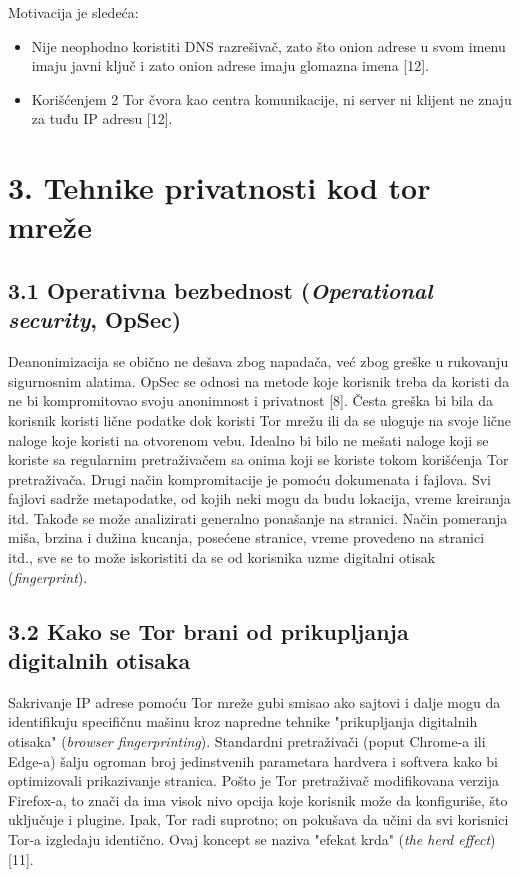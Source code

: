 \documentclass[
]{article}
\begin{document}
Motivacija je sledeća:

\begin{itemize}
\item
  Nije neophodno koristiti DNS razrešivač, zato što onion adrese u svom
  imenu imaju javni ključ i zato onion adrese imaju glomazna imena
  [12].
\item
  Korišćenjem 2 Tor čvora kao centra komunikacije, ni server ni klijent
  ne znaju za tuđu IP adresu [12].
\end{itemize}

\section{3. Tehnike privatnosti kod tor mreže}
\label{sec:t3}

\subsection{3.1 Operativna bezbednost (\emph{Operational security}, OpSec)}
\label{sec:t3.1}

Deanonimizacija se obično ne dešava zbog napadača, već zbog greške u
rukovanju sigurnosnim alatima. OpSec se odnosi na metode koje korisnik
treba da koristi da ne bi kompromitovao svoju anonimnost i privatnost
[8]. Česta greška bi bila da korisnik koristi lične podatke dok
koristi Tor mrežu ili da se uloguje na svoje lične naloge koje koristi
na otvorenom vebu. Idealno bi bilo ne mešati naloge koji se koriste sa
regularnim pretraživačem sa onima koji se koriste tokom korišćenja Tor
pretraživača. Drugi način kompromitacije je pomoću dokumenata i fajlova.
Svi fajlovi sadrže metapodatke, od kojih neki mogu da budu lokacija,
vreme kreiranja itd. Takođe se može analizirati generalno ponašanje na
stranici. Način pomeranja miša, brzina i dužina kucanja, posećene
stranice, vreme provedeno na stranici itd., sve se to može iskoristiti
da se od korisnika uzme digitalni otisak (\emph{fingerprint}).

\subsection{3.2 Kako se Tor brani od prikupljanja digitalnih otisaka}
\label{sec:t3.2}

Sakrivanje IP adrese pomoću Tor mreže gubi smisao ako sajtovi i dalje
mogu da identifikuju specifičnu mašinu kroz napredne tehnike "prikupljanja digitalnih otisaka" (\emph{browser fingerprinting}). Standardni pretraživači (poput
Chrome-a ili Edge-a) šalju ogroman broj jedinstvenih parametara hardvera
i softvera kako bi optimizovali prikazivanje stranica. Pošto je Tor
pretraživač modifikovana verzija Firefox-a, to znači da ima visok nivo
opcija koje korisnik može da konfiguriše, što uključuje i plugine. Ipak,
Tor radi suprotno; on pokušava da učini da svi korisnici Tor-a izgledaju
identično. Ovaj koncept se naziva "efekat krda" (\emph{the herd effect})
[11].
\end{document}
